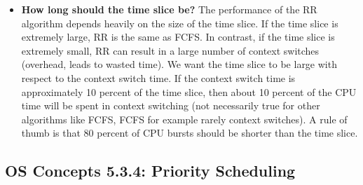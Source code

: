 \documentclass[12pt]{article}
\begin{document}
\begin{itemize}
    \item \textbf{How long should the time slice be?} The performance of the RR algorithm depends heavily on the size of the time slice. If the time slice is extremely large, RR is the same as FCFS. In contrast, if the time slice is extremely small, RR can result in a large number of context switches (overhead, leads to wasted time). We want the time slice to be large with respect to the context switch time. If the context switch time is approximately 10 percent of the time slice, then about 10 percent of the CPU time will be spent in context switching (not necessarily true for other algorithms like FCFS, FCFS for example rarely context switches). A rule of thumb is that 80 percent of CPU bursts should be shorter than the time slice.
\end{itemize}

\subsection*{OS Concepts 5.3.4: Priority Scheduling}
\end{document}
